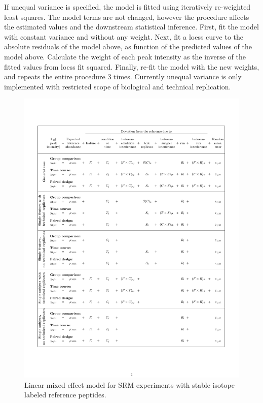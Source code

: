 \documentclass[11pt]{article}
\begin{document}
If unequal variance is specified, the model is fitted using iteratively re-weighted least squares. The model terms are not changed, however the procedure affects the estimated values and the downstream statistical inference. First, fit the model with constant variance and without any weight. Next, fit a loess curve to the absolute residuals of the model above, as function of the predicted values of the model above. Calculate the weight of each peak intensity as the inverse of the fitted values from loess fit squared. Finally, re-fit the model with the new weights, and repeats the entire procedure 3 times. Currently unequal variance is only implemented with restricted scope of biological and technical replication.


\begin{figure}[h!]
\begin{center}
\includegraphics[width=6in]{StatModel_labelbased.pdf}
\vspace{-0.3cm}
\caption{\small Linear mixed effect model for SRM experiments with stable isotope labeled reference peptides. \label{fig:statModelReference}}
\end{center}
\end{figure}
\end{document}
